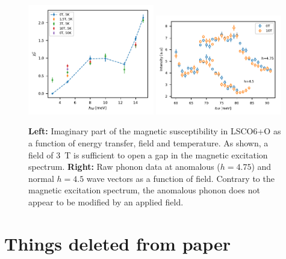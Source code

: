 \begin{figure}
    \centering
    \includegraphics[width=0.49\textwidth]{fig/anomaly/chi.pdf}
    \includegraphics[width=0.49\textwidth]{fig/anomaly/field_selected.pdf}
    \caption[LSCO6+O magnetic field effect on fluctuations and phonon]{\textbf{Left:} Imaginary part of the magnetic susceptibility in LSCO6+O as a function of energy transfer, field and temperature. As shown, a field of \SI{3}{\tesla} is sufficient to open a gap in the magnetic excitation spectrum. \textbf{Right:} Raw phonon data at anomalous ($h=4.75$) and normal $h=4.5$ wave vectors as a function of field. Contrary to the magnetic excitation spectrum, the anomalous phonon does not appear to be modified by an applied field.}
    \label{fig:phonon_chi_field}
\end{figure}

\section{Things deleted from paper}

